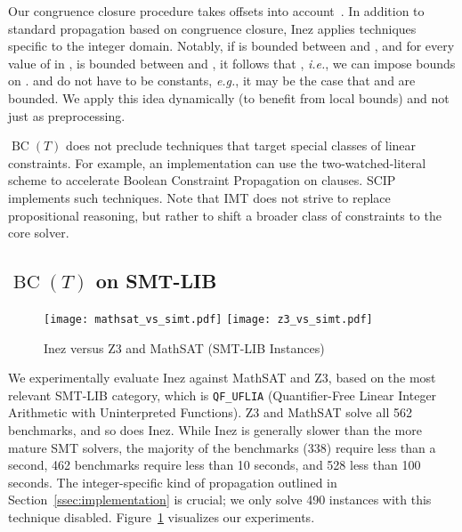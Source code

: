 \documentclass{llncs}
\newcommand{\inez}[0]{\textsf{Inez}}
\newcommand{\comment}[1]{}
\newcommand{\ie}[0]{\emph{i.e.}, }
\newcommand{\eg}[0]{\emph{e.g.}, }
\newcommand{\bct}[0]{\ensuremath{\operatorname{BC}(T)}}
\begin{document}
Our congruence closure procedure takes offsets into
account~\cite{ccoffsets}. In addition to standard propagation based on
congruence closure, \inez{} applies techniques specific to the integer
domain. Notably, if  is bounded between  and , and for every
value of  in ,  is bounded between  and , it
follows that , \ie we can impose bounds on
.  and  do not have to be constants, \eg it may be the
case that  and  are bounded. We apply this idea dynamically (to benefit from local
bounds) and not just as preprocessing.

\bct{} does not preclude techniques that target special classes of
linear constraints. For example, an implementation can use the
two-watched-literal scheme to accelerate Boolean Constraint
Propagation on clauses.  SCIP implements such techniques. Note that
IMT does not strive to replace propositional reasoning, but rather to
shift a broader class of constraints to the core solver.

\comment{SCIP performs floating-point arithmetic, and can thus provide
  wrong answers. \inez{} inherits this deficiency. For many applications,
  numerical inaccuracies are not a concern, \eg the noise in the model
  overshadows the floating point error intervals. \comment{or an
    answer close enough to the theoretical optimal suffices.}
  Floating-point arithmetic for linear programming is a well-studied
  trade-off. \bct{} can be laid out on top of an exact solver, if the
  application domain dictates accuracy.}

\subsection{\bct{} on SMT-LIB}

\begin{figure}[t]
\texttt{[image: mathsat\_vs\_simt.pdf]}
\texttt{[image: z3\_vs\_simt.pdf]}
\caption{\inez{} versus Z3 and MathSAT (SMT-LIB Instances)}
\label{fig:smtlib}
\end{figure}

We experimentally evaluate \inez{} against MathSAT and Z3, based on
the most relevant SMT-LIB category, which is \texttt{QF\_UFLIA}
(Quantifier-Free Linear Integer Arithmetic with Uninterpreted
Functions). Z3 and MathSAT solve all 562 benchmarks, and so does
\inez{}. While \inez{} is generally slower than the more mature SMT
solvers, the majority of the benchmarks (338) require less than a
second, 462 benchmarks require less than 10 seconds, and 528 less than
100 seconds. The integer-specific kind of propagation outlined in
Section~\ref{ssec:implementation} is crucial; we only solve 490
instances with this technique disabled.  Figure~\ref{fig:smtlib}
visualizes our experiments.
\end{document}
